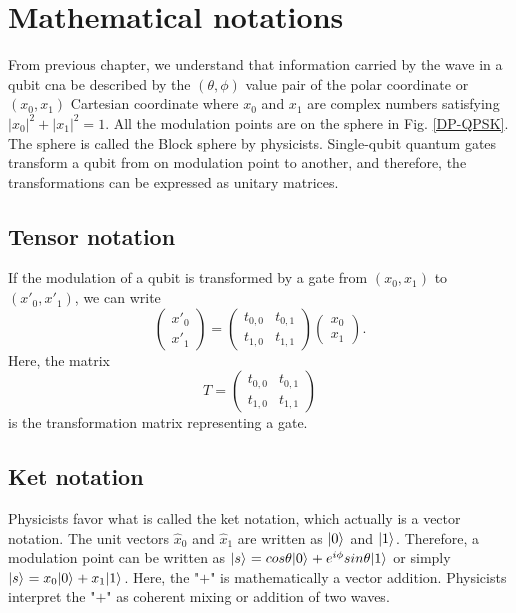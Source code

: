 \documentclass[oneside, letter, 12pt]{book}
\begin{document}
\section{Mathematical notations}
From previous chapter, we understand that information carried by the wave in a qubit cna be described by the $(\theta, \phi)$ value pair of the polar coordinate or $(x_0, x_1)$ Cartesian coordinate where $x_0$ and $x_1$ are complex numbers satisfying $|x_0|^2 + |x_1|^2 = 1$. All the modulation points are on the sphere in Fig. \ref{DP-QPSK}. The sphere is called the Block sphere by physicists. Single-qubit quantum gates transform a qubit from on modulation point to another, and therefore, the transformations can be expressed as unitary matrices.

\subsection{Tensor notation}
If the modulation of a qubit is transformed by a gate from $(x_0, x_1)$ to $(x'_0, x'_1)$, we can write
\begin{equation}
    \begin{pmatrix}
    x'_0 \\
    x'_1
\end{pmatrix}
=
    \begin{pmatrix}
    t_{0,0} & t_{0,1} \\
    t_{1,0} & t_{1,1} 
\end{pmatrix}
    \begin{pmatrix}
    x_0 \\
    x_1
\end{pmatrix}.
\end{equation}
Here, the matrix
\begin{equation}\label{e-T}
T
=
    \begin{pmatrix}
    t_{0,0} & t_{0,1} \\
    t_{1,0} & t_{1,1} 
\end{pmatrix}
\end{equation}
is the transformation matrix representing a gate.

\subsection{Ket notation}
Physicists favor what is called the ket notation, which actually is a vector notation. The unit vectors $\hat x_0$ and $\hat x_1$ are written as $\vert {0} \rangle_{}$ and $\vert {1} \rangle_{}$. Therefore, a modulation point can be written as $\vert {s} \rangle_{} = cos{\theta} \vert {0} \rangle_{} + e^{i \phi} sin{\theta} \vert {1} \rangle_{}$ or simply $\vert {s} \rangle_{} = x_0 \vert {0} \rangle_{} + x_1 \vert {1} \rangle_{}$. Here, the "$+$" is mathematically a vector addition. Physicists interpret the "$+$" as  coherent mixing or addition of two waves.
\end{document}
